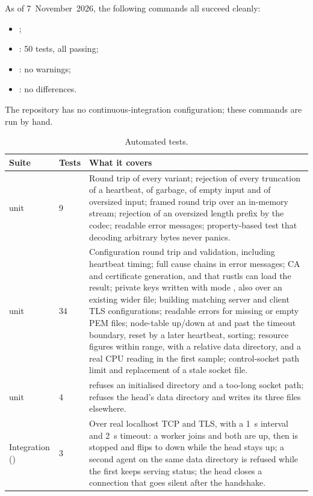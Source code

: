 \documentclass{article}
\begin{document}
As of 7~November~2026, the following commands all succeed cleanly:

\begin{itemize}
  \item {};
  \item {}: 50 tests, all passing;
  \item {}: no warnings;
  \item {}: no differences.
\end{itemize}

The repository has no continuous-integration configuration; these
commands are run by hand.

\begin{table}[htbp]
  \centering
  \begin{tabular}{L{0.24\textwidth}L{0.07\textwidth}L{0.57\textwidth}}
    \hline
    Suite & Tests & What it covers \\
    \hline
     unit & 9
      & Round trip of every variant; rejection of every truncation of a
        heartbeat, of garbage, of empty input and of oversized input;
        framed round trip over an in-memory stream; rejection of an
        oversized length prefix by the codec; readable error messages;
        property-based test that decoding arbitrary bytes never
        panics. \\
     unit & 34
      & Configuration round trip and validation, including heartbeat
        timing; full cause chains in error messages; CA and certificate
        generation, and that rustls can load the result; private keys
        written with mode , also over an existing wider file;
        building matching server and client TLS configurations; readable
        errors for missing or empty PEM files; node-table up/down at and
        past the timeout boundary, reset by a later heartbeat, sorting;
        resource figures within range, with a relative data directory,
        and a real CPU reading in the first sample; control-socket path
        limit and replacement of a stale socket file. \\
     unit & 4
      &  refuses an initialised directory and a too-long
        socket path;  refuses the head's data directory
        and writes its three files elsewhere. \\
    Integration () & 3
      & Over real localhost TCP and TLS, with a 1~s interval and 2~s
        timeout: a worker joins and both are up, then is stopped and flips
        to down while the head stays up; a second agent on the same data
        directory is refused while the first keeps serving status; the
        head closes a connection that goes silent after the
        handshake. \\
    \hline
  \end{tabular}
  \caption{Automated tests.}
  \label{tab:tests}
\end{table}
\end{document}
